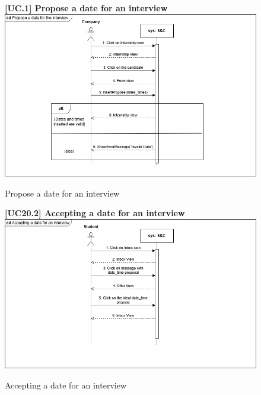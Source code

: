 \begin{figure}[H]
\textbf{[UC\nextUCDiagr.1] Propose a date for an interview}\newline\newline
\includegraphics[width=15cm]{Images/UC_diagram/RASD-UC18.drawio.png}
    \caption{Propose a date for an interview}
\end{figure}

\begin{figure}[H]
\textbf{[UC20.2] Accepting a date for an interview}\newline\newline
\includegraphics[width=15cm]{Images/UC_diagram/RASD-UC19.drawio.png}
    \caption{Accepting a date for an interview}
\end{figure}

